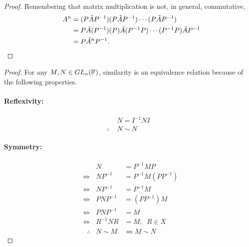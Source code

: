 \documentclass[../MathsNotesBase.tex]{subfiles}
\begin{document}
{		
		\bigskip
		\begin{tcolorbox}[breakable,enhanced jigsaw,colframe=white,colback=white,boxrule=0pt,arc=0pt,left=0pt,right=0pt,top=0pt,bottom=0pt]
			\begin{proof}
				Remembering that matrix multiplication is not, in general, commutative,
				\begin{align*}
					&& A^n &= (P \tilde{A} {P}^{-1})(P \tilde{A} {P}^{-1})\cdots(P \tilde{A} {P}^{-1}) \\
					&&  &= P \tilde{A} ({P}^{-1})(P) \tilde{A} ({P}^{-1}P) \cdots ({P}^{-1}P) \tilde{A} {P}^{-1} \\
					&&  &= P \tilde{A}^n {P}^{-1}. \qedhere
				\end{align*}
			\end{proof}
		\end{tcolorbox}
		
		\bigskip
		\begin{proof}
			For any ${ M,N \in GL_n(\mathbb{F}^{}) }$, similarity is an equivalence relation because of the following properties.
			
			\paragraph{\small{Reflexivity:}}
			\begin{align*}
			& N = I^{-1}NI \\
			\therefore \; & N \sim N
			\end{align*}
			
			\paragraph{\small{Symmetry:}}
			\begin{align*}
			& & N &= P^{-1}MP \\
			&\iff & NP^{-1} &= P^{-1}M(PP^{-1}) \\
			&\iff & NP^{-1} &= P^{-1}M \\
			&\iff & PNP^{-1} &= (PP^{-1})M \\
			&\iff & PNP^{-1} &= M \\
			&\iff & R^{-1}NR &= M,\;\; R \in X\\
			&\;\;\therefore & N \sim M &\iff M \sim N
			\end{align*}
			

\end{proof}}
\end{document}
